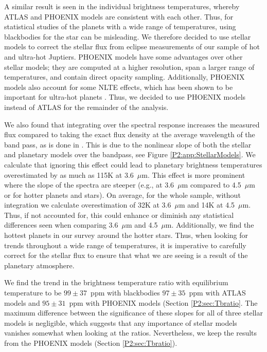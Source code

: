 \begin{subappendices}
A similar result is seen in the individual brightness temperatures, whereby ATLAS and PHOENIX models are consistent with each other. Thus, for statistical studies of the planets with a wide range of temperatures, using blackbodies for the star can be misleading. We therefore decided to use stellar models to correct the stellar flux from eclipse measurements of our sample of hot and ultra-hot Juptiers. PHOENIX models have some advantages over other stellar models; they are computed at a higher resolution, span a larger range of temperatures, and contain direct opacity sampling. Additionally, PHOENIX models also account for some NLTE effects, which has been shown to be important for ultra-hot planets \citep{Lothringer2019}. Thus, we decided to use PHOENIX models instead of ATLAS for the remainder of the analysis.

We also found that integrating over the spectral response increases the measured flux compared to taking the exact flux density at the average wavelength of the \spitzer band pass, as is done in \citet{Schwartz2015}. This is due to the nonlinear slope of both the stellar and planetary models over the bandpass, see Figure \ref{P2:app:StellarModels}. We calculate that ignoring this effect could lead to  planetary brightness temperatures overestimated by as much as 115K at 3.6~$\mu$m. This effect is more prominent where the slope of the spectra are steeper (e.g., at 3.6~$\mu$m compared to 4.5~$\mu$m or for hotter planets and stars). On average, for the whole sample, without integration we calculate overestimation of 32K at 3.6~$\mu$m and 14K at 4.5~$\mu$m. Thus, if not accounted for, this could enhance or diminish any statistical differences seen when comparing 3.6~$\mu$m and 4.5~$\mu$m. Additionally,  we find the hottest planets in our survey around the hotter stars. Thus, when looking for trends throughout a wide range of temperatures, it is imperative to carefully correct for the stellar flux  to ensure that what we are seeing is a result of the planetary atmosphere.

We find the trend in the brightness temperature ratio with equilibrium temperature to be $99\pm37$~ppm with blackbodies $97\pm35$~ppm with ATLAS models and $95\pm31$~ppm with PHOENIX models (Section \ref{P2:sec:Tbratio}. The maximum difference between the significance of these slopes for all of three stellar models is negligible, which suggests that any importance of stellar models  vanishes somewhat when looking at the ratios. Nevertheless, we keep the results from the PHOENIX models (Section \ref{P2:sec:Tbratio}).


\end{subappendices}

